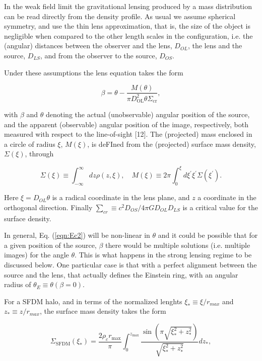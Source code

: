 \documentclass[9.5pt, twocolumn]{article}
\begin{document}
In the weak field limit the gravitational lensing produced by a mass distribution can be read directly from the density profile. As usual we assume spherical symmetry, and use the thin lens approximation, that is, the size of the object is negligible when compared to the other length scales in the configuration, i.e. the (angular) distances between the observer and the lens, $D_{OL}$, the lens and the source, $D_{LS}$, and from the observer to the source, $D_{OS}$.

Under these assumptions the lens equation takes the form

\begin{equation}
\beta=\theta-\frac{M(\theta)}{\pi D_{\mathrm{OL}}^{2} \theta \Sigma_{\mathrm{cr}}},
\label{eqn:eq2}
\end{equation}

with $\beta$ and $\theta$ denoting the actual (unobservable) angular
position of the source, and the apparent (observable) angular
position of the image, respectively, both measured
with respect to the line-of-sight [12]. The (projected)
mass enclosed in a circle of radius $\xi$, $M(\xi)$, is deFIned from the (projected) surface mass density, $\Sigma(\xi)$, through

\begin{equation}
\Sigma(\xi) \equiv \int_{-\infty}^{\infty} d z \rho(z, \xi), \quad M(\xi) \equiv 2 \pi \int_{0}^{\xi} d \xi^{\prime} \xi^{\prime} \Sigma\left(\xi^{\prime}\right).
\label{eqn:eq3}
\end{equation}

Here $\xi=D_{OL}\theta$ is a radical coordinate in the lens plane, and $z$ a coordinate in the orthogonal direction. Finally $\sum_{cr}\equiv c^2 D_{OS}/4\pi GD_{OL}D_{LS}$ is a critical value for the surface density. 

In general, Eq. (\ref{eqn:Ec2}) will be non-linear in $\theta$ and it could
be possible that for a given position of the source, $\beta$ there
would be multiple solutions (i.e. multiple images) for
the angle $\theta$. This is what happens in the strong lensing
regime to be discussed below. One particular case is that
with a perfect alignment between the source and the lens,
that actually defines the Einstein ring, with an angular
radius of $\theta_E\equiv\theta(\beta=0)$.

For a SFDM halo, and in terms of the normalized lenghts $\xi_{*}\equiv \xi/r_{max}$ and $z_*\equiv z/r_{max}$, the surface mass density takes the form

\begin{equation}
\Sigma_{\mathrm{SFDM}}\left(\xi_{*}\right)=\frac{2 \rho_{c} r_{\mathrm{max}}}{\pi} \int_{0}^{z_{\max }} \frac{\sin \left(\pi \sqrt{\xi_{*}^{2}+z_{*}^{2}}\right)}{\sqrt{\xi_{*}^{2}+z_{*}^{2}}} d z_{*},
\label{eqn:eq4}
\end{equation}
\end{document}
